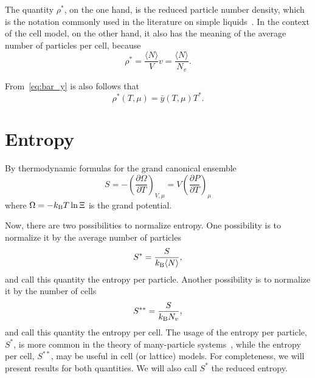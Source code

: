 \documentclass[12pt]{article}
\numberwithin{equation}{section}
\begin{document}
	The quantity $\rho^*$, on the one hand, is the reduced particle number density, which is the notation commonly used in the literature on simple liquids~\cite{HansenMcDonald13}. In the context of the cell model, on the other hand, it also has the meaning of the average number of particles per cell, because
	\begin{equation}
		\rho^* = \frac{\langle N \rangle}{V} v = \frac{\langle N \rangle}{N_v}.
	\end{equation}
	
	From~\eqref{eq:bar_y} is also follows that
	\begin{equation}
		\label{rho_vs_T_mu}
		\rho^*(T,\mu) = \bar{y}(T,\mu) T^*.
	\end{equation}
	
	
	\section{Entropy}
	By thermodynamic formulas for the grand canonical ensemble
	\begin{equation}
		S = -\left(\frac{\partial \Omega}{\partial T}\right)_{V,\mu} = V\left(\frac{\partial P}{\partial T}\right)_{\mu}
	\end{equation}
	where $\Omega = -k_{\rm B}T \ln \Xi$ is the grand potential. 
	
	Now, there are two possibilities to normalize entropy. One possibility is to normalize it by the average number of particles
	\begin{equation}
		S^{*} = \frac{S}{k_{\rm B} \langle N \rangle},
	\end{equation}
	and call this quantity the entropy per particle. Another possibility is to normalize it by the number of cells
	\begin{equation}
		S^{**} = \frac{S}{k_{\rm B}N_v},
	\end{equation}
	and call this quantity the entropy per cell. The usage of the entropy per particle, $S^*$, is more common in the theory of many-particle systems~\cite{HansenMcDonald13}, while the entropy per cell, $S^{**}$, may be useful in cell (or lattice) models. For completeness, we will present results for both quantities. We will also call $S^*$ the reduced entropy.
	
\end{document}
